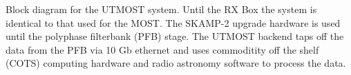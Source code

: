 Block diagram for the UTMOST system. Until the RX Box the system is identical to that used for the MOST. The SKAMP-2 upgrade hardware is used until the polyphase filterbank (PFB) stage. The UTMOST backend taps off the data from the PFB via 10 Gb ethernet and uses commoditity off the shelf (COTS) computing hardware and radio astronomy software to process the data.